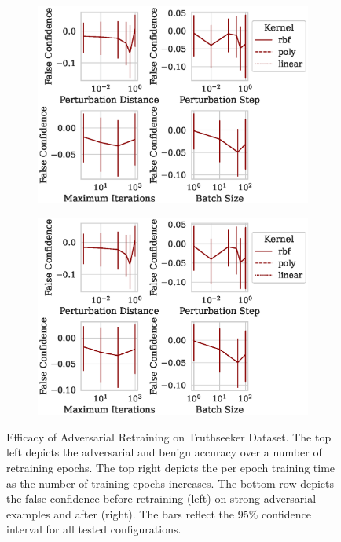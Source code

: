 \documentclass[fonts]{icst}
\begin{document}
\begin{appendices}
\begin{figure}[h!]
     \hfill
     \begin{subfigure}{0.47\textwidth}
         \centering
         \includegraphics[width=\textwidth]{./truthseeker/confidence_vs_attack_parameters.eps}
     \end{subfigure}
     \hfill
     \begin{subfigure}{0.47\textwidth}
         \centering
         \includegraphics[width=\textwidth]{./truthseeker/retrain_confidence_vs_attack_parameters.eps}
     \end{subfigure}
     \hfill
     \caption{Efficacy of Adversarial Retraining on Truthseeker Dataset.
The top left depicts the adversarial and benign accuracy over a number of retraining epochs.
The top right depicts the per epoch training time as the number of training epochs increases.
The bottom row depicts the false confidence before retraining (left) on strong adversarial examples and after (right).
The bars reflect the 95\% confidence interval for all tested configurations.}
     \label{fig:truthseeker}
\end{figure}
\end{appendices}
\end{document}

